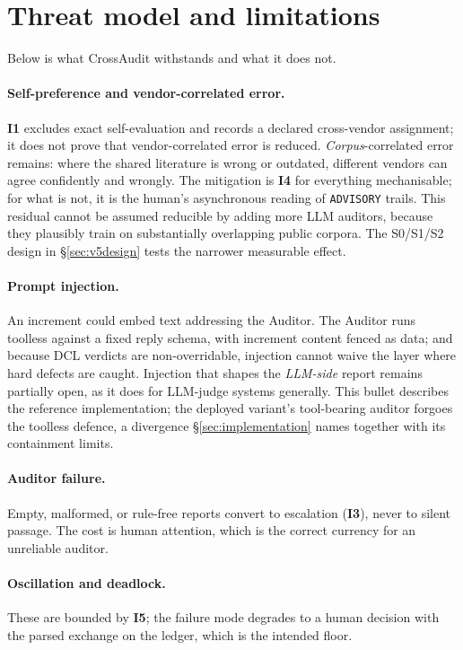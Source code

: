 \documentclass[11pt,letterpaper]{article}
\newcommand{\invariant}[1]{\textbf{I#1}}
\begin{document}
\section{Threat model and limitations}\label{sec:threat}

Below is what CrossAudit withstands and what it does not.

\paragraph{Self-preference and vendor-correlated error.} \invariant{1} excludes exact self-evaluation and records a declared cross-vendor assignment; it does not prove that vendor-correlated error is reduced. \emph{Corpus}-correlated error remains: where the shared literature is wrong or outdated, different vendors can agree confidently and wrongly. The mitigation is \invariant{4} for everything mechanisable; for what is not, it is the human's asynchronous reading of \texttt{ADVISORY} trails. This residual cannot be assumed reducible by adding more LLM auditors, because they plausibly train on substantially overlapping public corpora. The S0/S1/S2 design in \S\ref{sec:v5design} tests the narrower measurable effect.

\paragraph{Prompt injection.} An increment could embed text addressing the Auditor. The Auditor runs toolless against a fixed reply schema, with increment content fenced as data; and because DCL verdicts are non-overridable, injection cannot waive the layer where hard defects are caught. Injection that shapes the \emph{LLM-side} report remains partially open, as it does for LLM-judge systems generally. This bullet describes the reference implementation; the deployed variant's tool-bearing auditor forgoes the toolless defence, a divergence \S\ref{sec:implementation} names together with its containment limits.

\paragraph{Auditor failure.} Empty, malformed, or rule-free reports convert to escalation (\invariant{3}), never to silent passage. The cost is human attention, which is the correct currency for an unreliable auditor.

\paragraph{Oscillation and deadlock.} These are bounded by \invariant{5}; the failure mode degrades to a human decision with the parsed exchange on the ledger, which is the intended floor.
\end{document}

